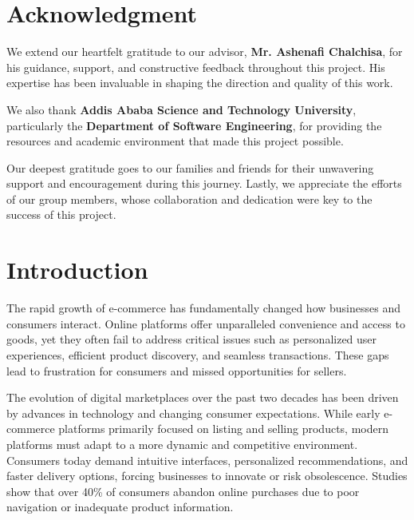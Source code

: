 \documentclass[12pt]{report}
\begin{document}

\chapter*{Acknowledgment}

We extend our heartfelt gratitude to our advisor, \textbf{Mr. Ashenafi Chalchisa}, for
his guidance, support, and constructive feedback throughout this project. His
expertise has been invaluable in shaping the direction and quality of this work.

We also thank \textbf{Addis Ababa Science and Technology University}, particularly the
\textbf{Department of Software Engineering}, for providing the resources and academic
environment that made this project possible.

Our deepest gratitude goes to our families and friends for their unwavering
support and encouragement during this journey. Lastly, we appreciate the
efforts of our group members, whose collaboration and dedication were key to the success of this project.

\newpage

\tableofcontents

\listoffigures
{}

\listoftables
{}

\clearpage
{}

\newpage

\chapter{Introduction}
The rapid growth of e-commerce has fundamentally changed how businesses and consumers
interact. Online platforms offer unparalleled convenience and access to goods, yet they often
fail to address critical issues such as personalized user experiences, efficient product
discovery, and seamless transactions. These gaps lead to frustration for consumers and missed
opportunities for sellers.

The evolution of digital marketplaces over the past two decades has been driven by advances
in technology and changing consumer expectations. While early e-commerce platforms
primarily focused on listing and selling products, modern platforms must adapt to a more
dynamic and competitive environment. Consumers today demand intuitive interfaces,
personalized recommendations, and faster delivery options, forcing businesses to innovate or
risk obsolescence. Studies show that over 40\% of consumers abandon online purchases due to
poor navigation or inadequate product information\cite{c1}\cite{c2}.
\end{document}

